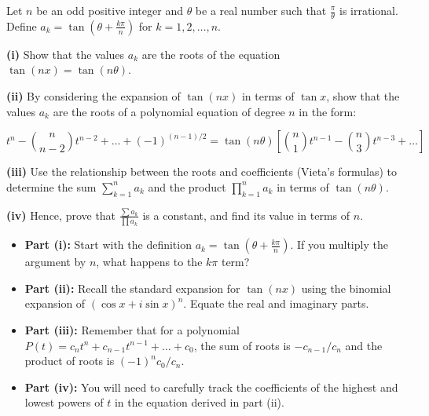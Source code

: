 \begin{problem}
Let $n$ be an odd positive integer and $\theta$ be a real number such that $\frac{\pi}{\theta}$ is irrational. Define $a_k = \tan\left(\theta + \frac{k\pi}{n}\right)$ for $k = 1, 2, \dots, n$.

\textbf{(i)} Show that the values $a_k$ are the roots of the equation $\tan(nx) = \tan(n\theta)$.

\textbf{(ii)} By considering the expansion of $\tan(nx)$ in terms of $\tan x$, show that the values $a_k$ are the roots of a polynomial equation of degree $n$ in the form:

$$t^n - \binom{n}{n-2}t^{n-2} + \dots + (-1)^{(n-1)/2} = \tan(n\theta) \left[ \binom{n}{1}t^{n-1} - \binom{n}{3}t^{n-3} + \dots \right]$$

\textbf{(iii)} Use the relationship between the roots and coefficients (Vieta's formulas) to determine the sum $\sum_{k=1}^n a_k$ and the product $\prod_{k=1}^n a_k$ in terms of $\tan(n\theta)$.

\textbf{(iv)} Hence, prove that $\frac{\sum a_k}{\prod a_k}$ is a constant, and find its value in terms of $n$.
\end{problem}

\begin{hint}
\begin{itemize}
    \item \textbf{Part (i):} Start with the definition $a_k = \tan(\theta + \frac{k\pi}{n})$. If you multiply the argument by $n$, what happens to the $k\pi$ term?
    \item \textbf{Part (ii):} Recall the standard expansion for $\tan(nx)$ using the binomial expansion of $(\cos x + i\sin x)^n$. Equate the real and imaginary parts.
    \item \textbf{Part (iii):} Remember that for a polynomial $P(t) = c_n t^n + c_{n-1} t^{n-1} + \dots + c_0$, the sum of roots is $-c_{n-1}/c_n$ and the product of roots is $(-1)^n c_0/c_n$.
    \item \textbf{Part (iv):} You will need to carefully track the coefficients of the highest and lowest powers of $t$ in the equation derived in part (ii).
\end{itemize}
\end{hint}

